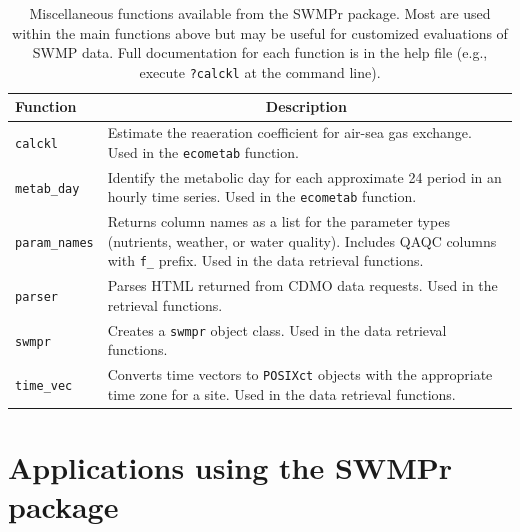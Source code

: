 \documentclass[10pt,letterpaper]{article}\usepackage[]{graphicx}\usepackage[]{color}
\begin{document}
\begin{table}[!tbp]
\caption{Miscellaneous functions available from the SWMPr package.  Most are used within the main functions above but may be useful for customized evaluations of \ac{SWMP} data.  Full documentation for each function is in the help file (e.g., execute \texttt{?calckl} at the command line).\label{tab:misc}} 
\begin{center}
\begin{tabular}{lp{3.5in}}
\hline\hline
\multicolumn{1}{l}{Function}&\multicolumn{1}{c}{Description}\tabularnewline
\hline
\texttt{calckl}&Estimate the reaeration coefficient for air-sea gas exchange.  Used in the \texttt{ecometab} function.\tabularnewline
\texttt{metab\_day}&Identify the metabolic day for each approximate 24 period in an hourly time series.  Used in the \texttt{ecometab} function.\tabularnewline
\texttt{param\_names}&Returns column names as a list for the parameter types (nutrients, weather, or water quality).  Includes \ac{QAQC} columns with \texttt{f\_} prefix. Used in the data retrieval functions.\tabularnewline
\texttt{parser}&Parses HTML returned from \ac{CDMO} data requests.  Used in the retrieval functions.\tabularnewline
\texttt{swmpr}&Creates a \texttt{swmpr} object class.  Used in the data retrieval functions.\tabularnewline
\texttt{time\_vec}&Converts time vectors to \texttt{POSIXct} objects with the appropriate time zone for a site.  Used in the data retrieval functions.\tabularnewline
\hline
\end{tabular}\end{center}

\end{table}


\section*{Applications using the SWMPr package}
\label{swmp_apps}
\end{document}
